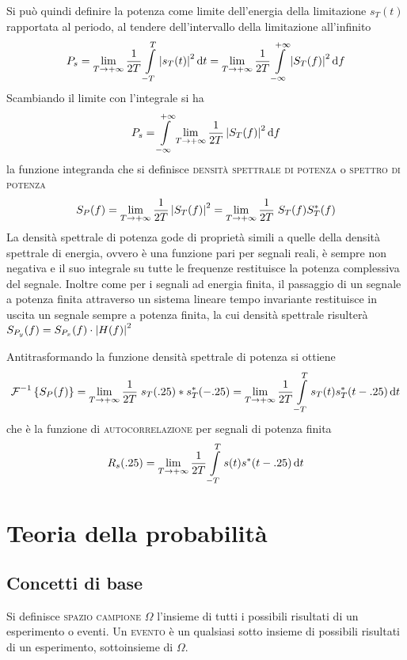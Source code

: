 Si può quindi definire la potenza come limite dell'energia della limitazione $s_T(t)$ rapportata al periodo, al tendere dell'intervallo della limitazione all'infinito
\[P_s=\lim\limits_{T\to+\infty}{\frac{1}{2T}\int\limits_{-T}^{T}{\left|{s_T(t)}\right|^2}{\,\mathop{}\!\mathrm{d}{t}}}=\lim\limits_{T\to+\infty}{\frac{1}{2T}\int\limits_{-\infty}^{+\infty}{\left|{S_T(f)}\right|^2}{\,\mathop{}\!\mathrm{d}{f}}}\]
Scambiando il limite con l'integrale si ha 
\[P_s=\int\limits_{-\infty}^{+\infty}{\lim\limits_{T\to+\infty}\frac{1}{2T}\left|{S_T(f)}\right|^2}{\,\mathop{}\!\mathrm{d}{f}}\]
la funzione integranda che si definisce \textsc{densità spettrale di potenza} o \textsc{spettro di potenza}
\begin{equation}
S_P(f)=\lim\limits_{T\to+\infty}{\frac{1}{2T}\left|{S_T(f)}\right|^2}=\lim\limits_{T\to+\infty}{\frac{1}{2T}\;S_T(f)S_{T}^\ast(f)}
\end{equation}
La densità spettrale di potenza gode di proprietà simili a quelle della densità spettrale di energia, ovvero è una funzione pari per segnali reali, è sempre non negativa e il suo integrale su tutte le frequenze restituisce la potenza complessiva del segnale.
Inoltre come per i segnali ad energia finita, il passaggio di un segnale a potenza finita attraverso un sistema lineare tempo invariante restituisce in uscita un segnale sempre a potenza finita, la cui densità spettrale risulterà $S_{P_y}(f)=S_{P_x}(f)\cdot\left|{H(f)}\right|^2$

Antitrasformando la funzione densità spettrale di potenza si ottiene 
\[\operatorname{\mathcal{F}}^{-1}\left\lbrace{S_P(f)}\right\rbrace=\lim\limits_{T\to+\infty}{\frac{1}{2T}\;s_T(.25)\ast s_{T}^\ast(-.25)}=\lim\limits_{T\to+\infty}{\frac{1}{2T}\int\limits_{-T}^{T}{s_T(t)s_{T}^\ast(t-.25)}{\,\mathop{}\!\mathrm{d}{t}}}\]
che è la funzione di \textsc{autocorrelazione} per segnali di potenza finita
\begin{equation}R_s(.25)=\lim\limits_{T\to+\infty}{\frac{1}{2T}\int\limits_{-T}^{T}{s(t){s}^\ast(t-.25)}{\,\mathop{}\!\mathrm{d}{t}}}\end{equation}

\chapter{Teoria della probabilità}

\section{Concetti di base}
Si definisce \textsc{spazio campione $\Omega$} l'insieme di tutti i possibili risultati di un esperimento o eventi. Un \textsc{evento} è un qualsiasi sotto insieme di possibili risultati di un esperimento, sottoinsieme di $\Omega$.

